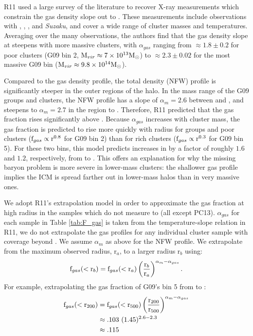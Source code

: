 R11 used a large survey of the literature to recover X-ray
measurements which constrain the gas density slope out to
\rfive{}. These measurements include observations with \Rosat{},
\Chandra, \XMM, and \textit{Suzaku}, and cover a wide range of cluster
masses and temperatures. Averaging over the many observations, the
authors find that the gas density slope at \rfive{} steepens with more
massive clusters, with $\alpha_{gas}$ ranging from $\approx 1.8 \pm
0.2$ for poor clusters (G09 bin 2, $\textrm{M\ensuremath{_{vir}}} \approx 7\times 10^{13}\textrm{M}_\odot$)
to $\approx 2.3 \pm 0.02$ for the most massive G09 bin ($\textrm{M\ensuremath{_{vir}}}
\approx9.8\times 10^{14}\textrm{M}_\odot$). 

Compared to the gas density profile, the total density (NFW) profile
is significantly steeper in the outer regions of the halo. In the mass
range of the G09 groups and clusters, the NFW profile has a slope of
$\alpha_m = 2.6$ between \rfive{} and \rtwo{}, and steepens to
$\alpha_m = 2.7$ in the region \rtwo{} to \rvir{}. Therefore, R11
predicted that the gas fraction rises significantly above
\rfive{}. Because $\alpha_{gas}$ increases with cluster mass, the gas
fraction is predicted to rise more quickly with radius for groups and
poor clusters ($\textrm{f\ensuremath{_{gas}}}\propto \textrm{r}^{0.8}$ for G09 bin 2) than for
rich clusters ($\textrm{f\ensuremath{_{gas}}} \propto \textrm{r}^{0.3}$ for G09 bin 5). For
these two bins, this model predicts increases in \fg{} by a factor of
roughly $1.6$ and $1.2$, respectively, from \rfive{} to \rvir{}. This
offers an explanation for why the missing baryon problem is more
severe in lower-mass clusters: the shallower gas profile implies the
ICM is spread farther out in lower-mass halos than in very massive
ones.

We adopt R11's extrapolation model in order to approximate the gas
fraction at high radius in the samples which do not measure \fg{} to
\rvir{} (all except PC13). $\alpha_{gas}$ for each sample in Table
\ref{tab:F_gas} is taken from the temperature-slope relation in R11,
we do not extrapolate the gas profiles for any individual cluster
sample with coverage beyond \rfive{}. We assume $\alpha_m$ as
above for the NFW profile. We extrapolate \fg{} from the maximum
observed radius, r$_a$, to a larger radius r$_b$ using:
\begin{equation}
\textrm{f\ensuremath{_{gas}}}(<\textrm{r}_b) =
\textrm{f\ensuremath{_{gas}}}(<\textrm{r}_a)\left(\frac{\textrm{r}_b}{\textrm{r}_a}\right)^{\alpha_m - \alpha_{gas}}.
\end{equation}
 For example, extrapolating the gas fraction of G09's bin 5 from \rfive{} to \rtwo{}:
\begin{align}
\textrm{f\ensuremath{_{gas}}}{}(<\textrm{r\ensuremath{_{200}}}) &=
\textrm{f\ensuremath{_{gas}}}{}(<\textrm{r\ensuremath{_{500}}})\left(\frac{\textrm{r\ensuremath{_{200}}}}{\textrm{r\ensuremath{_{500}}}}\right)^{\alpha_m -
  \alpha_{gas}} \nonumber\\
&\approx .103~(1.45)^{2.6 - 2.3} \nonumber \\
&\approx .115 \nonumber
\end{align}

